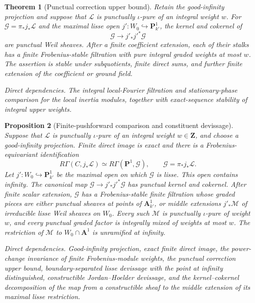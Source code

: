 \documentclass[10pt]{article}
\newtheorem{theorem}{Theorem}[section]
\newtheorem{proposition}[theorem]{Proposition}
\theoremstyle{definition}
\newcommand{\dep}[1]{\par\smallskip\noindent\textit{Direct dependencies.} #1\par}
\begin{document}
\begin{theorem}[Punctual correction upper bound]
Retain the good-infinity projection and suppose that \(\mathcal L\) is
punctually \(\iota\)-pure of an integral weight \(w\).  For
\(\mathcal G=\pi_*j_*\mathcal L\) and the maximal lisse open
\(j':W_0\hookrightarrow\mathbf P^1_{k'}\), the kernel and cokernel of
\[
                 \mathcal G\longrightarrow j'_*j'^*\mathcal G
\]
are punctual Weil sheaves.  After a finite coefficient extension, each of
their stalks has a finite Frobenius-stable filtration with pure integral
graded weights at most \(w\).  The assertion is stable under subquotients,
finite direct sums, and further finite extension of the coefficient or
ground field.
\dep{The integral local-Fourier filtration and stationary-phase comparison
for the local inertia modules, together with exact-sequence stability of
integral upper weights.}
\end{theorem}

\begin{proposition}[Finite-pushforward comparison and constituent
devissage]
Suppose that \(\mathcal L\) is punctually \(\iota\)-pure of an integral
weight \(w\in\mathbf Z\), and choose a good-infinity projection.  Finite
direct image is exact and there
is a Frobenius-equivariant identification
\[
 R\Gamma(C,j_*\mathcal L)
 \simeq R\Gamma(\mathbf P^1,\mathcal G),
 \qquad \mathcal G=\pi_*j_*\mathcal L.
\]
Let \(j':W_0\hookrightarrow\mathbf P^1_{k'}\) be the maximal open on which
\(\mathcal G\) is lisse.  This open contains infinity.  The canonical map
\(\mathcal G\to j'_*j'^*\mathcal G\) has punctual kernel and cokernel.
After finite scalar extension, \(\mathcal G\) has a Frobenius-stable finite
filtration whose
graded pieces are either punctual sheaves at points of
\(\mathbf A^1_{k'}\), or middle extensions \(j'_*\mathcal M\) of
irreducible lisse Weil sheaves on \(W_0\).  Every such \(\mathcal M\) is
punctually \(\iota\)-pure of weight \(w\), and every punctual graded factor
is integrally mixed of weights at most \(w\).  The restriction of \(\mathcal M\) to
\(W_0\cap\mathbf A^1\) is unramified at infinity.
\dep{Good-infinity projection, exact finite direct image, the power-change
invariance of finite Frobenius-module weights, the punctual correction
upper bound, boundary-separated lisse
devissage with the point at infinity distinguished, constructible
Jordan--Hoelder devissage, and the kernel--cokernel decomposition of the
map from a constructible sheaf to the middle extension of its maximal
lisse restriction.}
\end{proposition}
\end{document}
